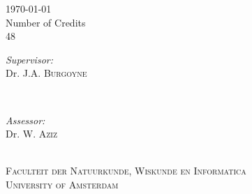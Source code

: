 \begin{titlepage}
\begin{fullwidth}
        {\Large \today}\\[1cm] %
        
        Number of Credits\\ %
        48\\[1cm]%
        
        \begin{minipage}[t]{0.4\textwidth}
        \begin{flushleft} \large
        \emph{Supervisor:} \\
        Dr. J.A. \textsc{Burgoyne}%
        \end{flushleft}
        \end{minipage}
        ~
        \begin{minipage}[t]{0.4\textwidth}
        \begin{flushright} \large
        \emph{Assessor:} \\
        Dr. W.  \textsc{Aziz}\\
        \end{flushright}
        \end{minipage}\\[2cm]
        
        
        \textsc{Faculteit der Natuurkunde, Wiskunde en Informatica}\\[1.0cm]
        \textsc{\large University of Amsterdam}\\[1.0cm] %
        
        
        \vfill %
    \end{fullwidth}
\end{titlepage}